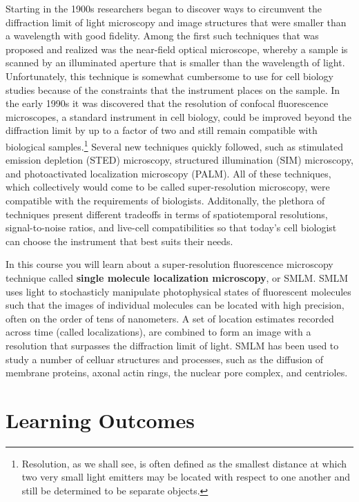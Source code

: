 \documentclass[10pt,a4paper]{book}
\begin{document}
Starting in the 1900s researchers began to discover ways to circumvent the diffraction limit of light microscopy and image structures that were smaller than a wavelength with good fidelity. Among the first such techniques that was proposed and realized was the near-field optical microscope, whereby a sample is scanned by an illuminated aperture that is smaller than the wavelength of light. Unfortunately, this technique is somewhat cumbersome to use for cell biology studies because of the constraints that the instrument places on the sample. In the early 1990s it was discovered that the resolution of confocal fluorescence microscopes, a standard instrument in cell biology, could be improved beyond the diffraction limit by up to a factor of two and still remain compatible with biological samples.\footnote{Resolution, as we shall see, is often defined as the smallest distance at which two very small light emitters may be located with respect to one another and still be determined to be separate objects.} Several new techniques quickly followed, such as stimulated emission depletion (STED) microscopy, structured illumination (SIM) microscopy, and photoactivated localization microscopy (PALM). All of these techniques, which collectively would come to be called super-resolution microscopy, were compatible with the requirements of biologists. Additonally, the plethora of techniques present different tradeoffs in terms of spatiotemporal resolutions, signal-to-noise ratios, and live-cell compatibilities so that today's cell biologist can choose the instrument that best suits their needs.

In this course you will learn about a super-resolution fluorescence microscopy technique called \textbf{single molecule localization microscopy}, or SMLM. SMLM uses light to stochasticly manipulate photophysical states of fluorescent molecules such that the images of individual molecules can be located with high precision, often on the order of tens of nanometers. A set of location estimates recorded across time (called localizations), are combined to form an image with a resolution that surpasses the diffraction limit of light. SMLM has been used to study a number of celluar structures and processes, such as the diffusion of membrane proteins, axonal actin rings, the nuclear pore complex, and centrioles.

\section{Learning Outcomes}
\end{document}
